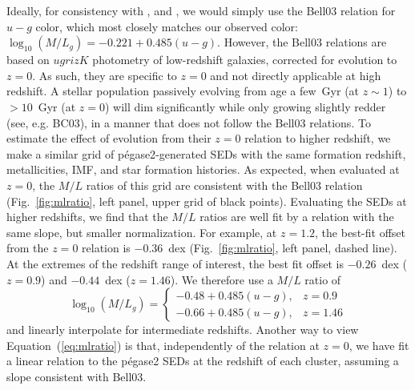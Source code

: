 Ideally, for consistency with \citet{sharon07a}, \citet{sharon10a}
and \citet{dilday10a}, we would simply use the Bell03 relation for
$u-g$ color, which most closely matches our observed color: $\log_{10}
(M/L_g) = -0.221 +0.485(u-g)$. However, the Bell03
relations are based on $ugrizK$ photometry of low-redshift galaxies,
corrected for evolution to $z=0$. As such, they are specific to $z=0$
and not directly applicable at high redshift. A stellar population
passively evolving from age a few~Gyr (at $z \sim 1$) to $> 10$~Gyr
(at $z=0$) will dim significantly while only growing slightly redder
(see, e.g. BC03), in a manner that does not follow the Bell03
relations.  To estimate the effect of evolution from their $z=0$
relation to higher redshift, we make a similar grid of {\sc
p{\'e}gase2}-generated SEDs with the same formation redshift,
metallicities, IMF, and star formation histories. As expected, when
evaluated at $z=0$, the $M/L$ ratios of this grid are consistent with
the Bell03 relation (Fig.~\ref{fig:mlratio}, left panel, upper grid of
black points). Evaluating the SEDs at higher redshifts, we find that
the $M/L$ ratios are well fit by a relation with the same slope, but
smaller normalization. For example, at $z=1.2$, the best-fit offset
from the $z=0$ relation is $-0.36$~dex (Fig.~\ref{fig:mlratio}, left
panel, dashed line). At the extremes of the redshift range of
interest, the best fit offset is $-0.26$~dex ($z=0.9$) and $-0.44$~dex
($z=1.46$). We therefore use a $M/L$ ratio of
\begin{equation} \label{eq:mlratio}
\log_{10} (M/L_g) = \left\{ \begin{array}{ll}
-0.48+0.485(u-g), & z=0.9 \\
-0.66+0.485(u-g), & z=1.46
\end{array} \right.
\end{equation}
and linearly interpolate for intermediate redshifts. Another way to
view Equation~(\ref{eq:mlratio}) is that, independently of the
relation at $z=0$, we have fit a linear relation to the {\sc
p{\'e}gase2} SEDs at the redshift of each cluster, assuming a slope
consistent with Bell03.



